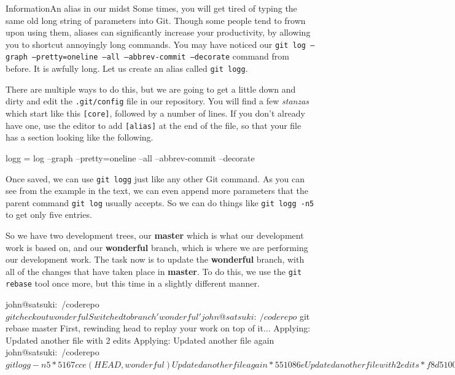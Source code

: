 \begin{callout}{Information}{An alias in our midst}
Some times, you will get tired of typing the same old long string of parameters into Git.
Though some people tend to frown upon using them, aliases can significantly increase your productivity, by allowing you to shortcut annoyingly long commands.
You may have noticed our \texttt{git log --graph --pretty=oneline --all --abbrev-commit --decorate} command from before.
It is awfully long.
Let us create an alias called \texttt{git logg}.

There are multiple ways to do this, but we are going to get a little down and dirty and edit the \texttt{.git/config} file in our repository.
You will find a few \emph{stanzas} which start like this \texttt{[core]}, followed by a number of lines.
If you don't already have one, use the editor to add \texttt{[alias]} at the end of the file, so that your file has a section looking like the following.

\begin{code}
[alias]
        logg = log --graph --pretty=oneline --all
 \carriagereturn \dlsh --abbrev-commit --decorate
\end{code}

Once saved, we can use \texttt{git logg} just like any other Git command.
As you can see from the example in the text, we can even append more parameters that the parent command \texttt{git log} usually accepts.
So we can do things like \texttt{git logg -n5} to get only five entries.
\end{callout}

So we have two development trees, our \textbf{master} which is what our development work is based on, and our \textbf{wonderful} branch, which is where we are performing our development work.
The task now is to update the \textbf{wonderful} branch, with all of the changes that have taken place in \textbf{master}.
To do this, we use the \texttt{git rebase} tool once more, but this time in a slightly different manner.

\begin{code}
john@satsuki:~/coderepo$ git checkout wonderful
Switched to branch 'wonderful'
john@satsuki:~/coderepo$ git rebase master
First, rewinding head to replay your work on top of it...
Applying: Updated another file with 2 edits
Applying: Updated another file again
john@satsuki:~/coderepo$ git logg -n5
* 5167cce (HEAD, wonderful) Updated another file again
* 551086e Updated another file with 2 edits
* f8d5100 (master) Finished new dev
* 1968324 Start new dev
* 1c3206a Added a new file
john@satsuki:~/coderepo$
\end{code}

